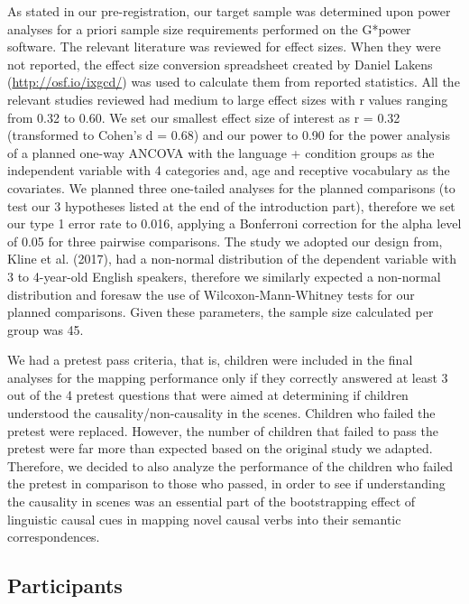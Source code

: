 \documentclass[man]{apa6}
\begin{document}
As stated in our pre-registration, our target sample was determined upon
power analyses for a priori sample size requirements performed on the
G*power software. The relevant literature was reviewed for effect sizes.
When they were not reported, the effect size conversion spreadsheet
created by Daniel Lakens (\url{http://osf.io/ixgcd/}) was used to
calculate them from reported statistics. All the relevant studies
reviewed had medium to large effect sizes with r values ranging from
0.32 to 0.60. We set our smallest effect size of interest as r = 0.32
(transformed to Cohen's d = 0.68) and our power to 0.90 for the power
analysis of a planned one-way ANCOVA with the language + condition
groups as the independent variable with 4 categories and, age and
receptive vocabulary as the covariates. We planned three one-tailed
analyses for the planned comparisons (to test our 3 hypotheses listed at
the end of the introduction part), therefore we set our type 1 error
rate to 0.016, applying a Bonferroni correction for the alpha level of
0.05 for three pairwise comparisons. The study we adopted our design
from, Kline et al. (2017), had a non-normal distribution of the
dependent variable with 3 to 4-year-old English speakers, therefore we
similarly expected a non-normal distribution and foresaw the use of
Wilcoxon-Mann-Whitney tests for our planned comparisons. Given these
parameters, the sample size calculated per group was 45.

We had a pretest pass criteria, that is, children were included in the
final analyses for the mapping performance only if they correctly
answered at least 3 out of the 4 pretest questions that were aimed at
determining if children understood the causality/non-causality in the
scenes. Children who failed the pretest were replaced. However, the
number of children that failed to pass the pretest were far more than
expected based on the original study we adapted. Therefore, we decided
to also analyze the performance of the children who failed the pretest
in comparison to those who passed, in order to see if understanding the
causality in scenes was an essential part of the bootstrapping effect of
linguistic causal cues in mapping novel causal verbs into their semantic
correspondences.

\subsection{Participants}\label{participants}
\end{document}
